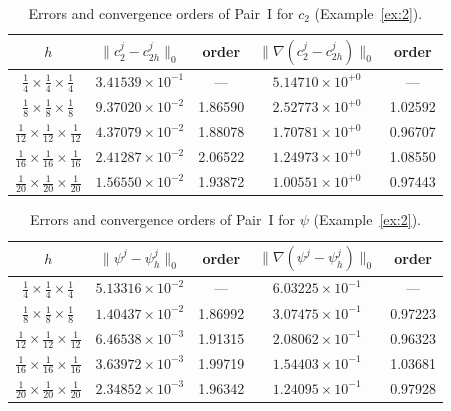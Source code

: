 \begin{table}[htbp]
\centering
\caption{Errors and convergence orders of Pair~I for $c_{2}$ (Example~\ref{ex:2}).}
\label{tab:3d-c2}
\begin{tabular}{ccccc}
\hline
$h$ &
$\|c_{2}^{j} - c_{2h}^{j}\|_{0}$ & order &
$\|\nabla(c_{2}^{j} - c_{2h}^{j})\|_{0}$ & order \\
\hline
$\tfrac{1}{4}  \times \tfrac{1}{4}  \times \tfrac{1}{4}$  & $3.41539\times10^{-1}$ & ---     & $5.14710\times10^{+0}$ & ---     \\
$\tfrac{1}{8}  \times \tfrac{1}{8}  \times \tfrac{1}{8}$  & $9.37020\times10^{-2}$ & 1.86590 & $2.52773\times10^{+0}$ & 1.02592 \\
$\tfrac{1}{12} \times \tfrac{1}{12} \times \tfrac{1}{12}$ & $4.37079\times10^{-2}$ & 1.88078 & $1.70781\times10^{+0}$ & 0.96707 \\
$\tfrac{1}{16} \times \tfrac{1}{16} \times \tfrac{1}{16}$ & $2.41287\times10^{-2}$ & 2.06522 & $1.24973\times10^{+0}$ & 1.08550 \\
$\tfrac{1}{20} \times \tfrac{1}{20} \times \tfrac{1}{20}$ & $1.56550\times10^{-2}$ & 1.93872 & $1.00551\times10^{+0}$ & 0.97443 \\
\hline
\end{tabular}
\end{table}

\begin{table}[htbp]
\centering
\caption{Errors and convergence orders of Pair~I for $\psi$ (Example~\ref{ex:2}).}
\label{tab:3d-psi}
\begin{tabular}{ccccc}
\hline
$h$ &
$\|\psi^{j} - \psi_{h}^{j}\|_{0}$ & order &
$\|\nabla(\psi^{j} - \psi_{h}^{j})\|_{0}$ & order \\
\hline
$\tfrac{1}{4}  \times \tfrac{1}{4}  \times \tfrac{1}{4}$  & $5.13316\times10^{-2}$ & ---     & $6.03225\times10^{-1}$ & ---     \\
$\tfrac{1}{8}  \times \tfrac{1}{8}  \times \tfrac{1}{8}$  & $1.40437\times10^{-2}$ & 1.86992 & $3.07475\times10^{-1}$ & 0.97223 \\
$\tfrac{1}{12} \times \tfrac{1}{12} \times \tfrac{1}{12}$ & $6.46538\times10^{-3}$ & 1.91315 & $2.08062\times10^{-1}$ & 0.96323 \\
$\tfrac{1}{16} \times \tfrac{1}{16} \times \tfrac{1}{16}$ & $3.63972\times10^{-3}$ & 1.99719 & $1.54403\times10^{-1}$ & 1.03681 \\
$\tfrac{1}{20} \times \tfrac{1}{20} \times \tfrac{1}{20}$ & $2.34852\times10^{-3}$ & 1.96342 & $1.24095\times10^{-1}$ & 0.97928 \\
\hline
\end{tabular}
\end{table}

